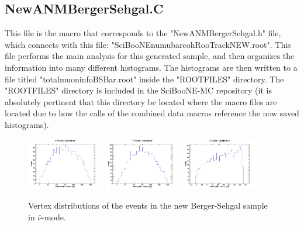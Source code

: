 \documentclass[11pt]{article}
\begin{document}
\subsection{NewANMBergerSehgal.C}
This file is the macro that corresponds to the "NewANMBergerSehgal.h" file, which connects with this file: "SciBooNE\textunderscore numubar\textunderscore coh\textunderscore RooTrack\textunderscore NEW.root". This file performs the main analysis for this generated sample, and then organizes the information into many different histograms. The histograms are then written to a file titled "totalmuoninfoBSBar.root" inside the "ROOTFILES" directory. The "ROOTFILES" directory is included in the SciBooNE-MC repository (it is absolutely pertinent that this directory be located where the macro files are located due to how the calls of the combined data macros reference the now saved histograms).


\begin{figure}[H]
\centering
\includegraphics[width=0.3\textwidth]{NewANMBergerSehgalImages/4-XVertexDistributionANMBS.png}
\includegraphics[width=0.3\textwidth]{NewANMBergerSehgalImages/3-YVertexDistributionANMBS.png}
\includegraphics[width=0.3\textwidth]{NewANMBergerSehgalImages/2-ZVertexDistributionANMBS.png}
\caption{Vertex distributions of the events in the new Berger-Sehgal sample in $\bar{\nu}$-mode.}
\end{figure}
\end{document}
